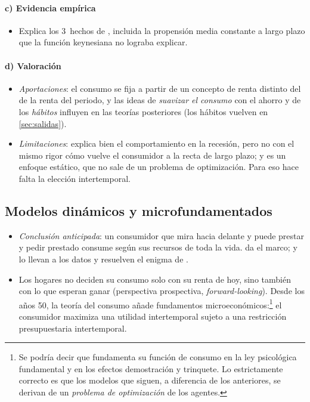 \documentclass[11pt]{article}
\begin{document}
\paragraph{c) Evidencia empírica}

\begin{itemize}
\item Explica los 3~hechos de , incluida la propensión media constante a largo plazo que la función keynesiana no lograba explicar.
\end{itemize}

\paragraph{d) Valoración}

\begin{itemize}
\item \emph{Aportaciones}: el consumo se fija a partir de un concepto de renta distinto del de la renta del periodo, y las ideas de \emph{suavizar el consumo} con el ahorro y de los \emph{hábitos} influyen en las teorías posteriores (los hábitos vuelven en \ref{sec:salidas}).
\item \emph{Limitaciones}: explica bien el comportamiento en la recesión, pero no con el mismo rigor cómo vuelve el consumidor a la recta de largo plazo; y es un enfoque estático, que no sale de un problema de optimización. Para eso hace falta la elección intertemporal.
\end{itemize}

\subsection{Modelos dinámicos y microfundamentados}\label{sec:dinamicos}

\begin{itemize}
\item \emph{Conclusión anticipada}: un consumidor que mira hacia delante y puede prestar y pedir prestado consume según sus recursos de toda la vida.  da el marco;  y  lo llevan a los datos y resuelven el enigma de .
\item Los hogares no deciden su consumo solo con su renta de hoy, sino también con lo que esperan ganar (perspectiva prospectiva, \emph{forward-looking}). Desde los años 50, la teoría del consumo añade fundamentos microeconómicos:\footnote{Se podría decir que  fundamenta su función de consumo en la ley psicológica fundamental y  en los efectos demostración y trinquete. Lo estrictamente correcto es que los modelos que siguen, a diferencia de los anteriores, se derivan de un \emph{problema de optimización} de los agentes.} el consumidor maximiza una utilidad intertemporal sujeto a una restricción presupuestaria intertemporal.
\end{itemize}
\end{document}
